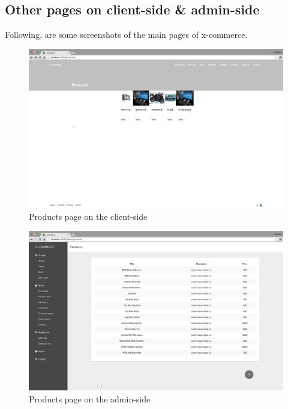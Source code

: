 \subsection{Other pages on client-side \& admin-side}
Following, are some screenshots of the main pages of x-commerce.
\newline
\begin{figure}[htb]
\centering
\includegraphics[width=1.0\linewidth]{images/chapter4/page-products-all-cli.png}\hfill
\caption[Products page on the client-side]{Products page on the client-side}
\label{fig:page_products_cli}
\end{figure}
\newpage
\begin{figure}[htb]
\centering
\includegraphics[width=1.0\linewidth]{images/chapter4/page-products-all.png}\hfill
\caption[Products page on the admin-side]{Products page on the admin-side}
\label{fig:page_products_admin}
\end{figure}
